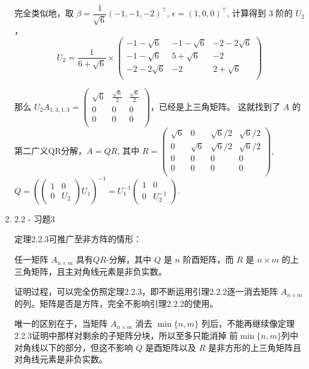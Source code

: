 \documentclass{article}
\begin{document}
\begin{spacing}{1.5}
\begin{enumerate}
    完全类似地，取 $\beta = \dfrac{1}{\sqrt 6}(-1, -1, -2)^\top$, $\epsilon = (1, 0, 0)^\top$, 计算得到 $3$ 阶的 $U_2$， 
    $$U_2=\dfrac{1}{6+\sqrt{6}}\times
    \left(\begin{array}{ccc}
        -1-\sqrt{6} & -1-\sqrt{6} & -2-2\sqrt{6}\\
        -1-\sqrt{6} & 5+\sqrt{6} & -2 \\
        -2-2\sqrt{6} & -2 & 2+\sqrt 6 \\
    \end{array}\right)$$

    那么 $U_2A_{1:3, 1:3} = \left(
        \begin{array}{ccc}
            \sqrt{6} & \frac{\sqrt{6}}{2} & \frac{\sqrt{6}}{2}\\
            0 & 0 & 0\\
            0 & 0 & 0\\
        \end{array}
    \right)$，已经是上三角矩阵。
    这就找到了 $A$ 的第二广义QR分解，$A=QR$, 其中 
    $R = \left(\begin{array}{cccc}
        \sqrt{6} & 0 & \sqrt{6}/2 & \sqrt{6}/2\\
        0 & \sqrt{6} & \sqrt{6}/2 & \sqrt{6}/2\\
        0 & 0 & 0 & 0\\
        0 & 0 & 0 & 0\\
    \end{array}\right) $, $Q = \left(\left(\begin{array}{cc}1&0\\0&U_2\end{array}\right)U_1\right)^{-1} = U_1^{-1}\left(\begin{array}{cc}1&0\\0&U_2^{-1}\end{array}\right)$.
    
    \item 2.2 - 习题3
    
    定理2.2.3可推广至非方阵的情形：

    任一矩阵 $A_{n\times m}$ 具有$QR$-分解，其中 $Q$ 是 $n$ 阶酉矩阵，而 $R$ 是 $n\times m$ 的上三角矩阵，且主对角线元素是非负实数。

    证明过程，可以完全仿照定理2.2.3，即不断运用引理2.2.2逐一消去矩阵 $A_{n\times m}$ 的列。矩阵是否是方阵，完全不影响引理2.2.2的使用。

    唯一的区别在于，当矩阵 $A_{n\times m}$ 消去 $\min\{n,m\}$ 列后，不能再继续像定理2.2.3证明中那样对剩余的子矩阵分块，所以至多只能消掉
    前$\min\{n,m\}$列中对角线以下的部分，但这不影响 $Q$ 是酉矩阵以及 $R$ 是非方形的上三角矩阵且对角线元素是非负实数。


\end{enumerate}
\end{spacing}
\end{document}
